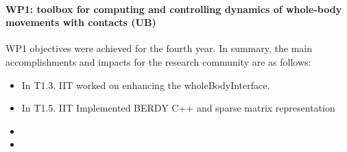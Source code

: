 

\paragraph*{WP1: toolbox for computing and controlling dynamics of whole-body movements with contacts (UB)}

WP1 objectives were achieved for the fourth year.  In summary, the main
accomplishments and impacts for the research community are as follows:

\begin{itemize}
  
\item In T1.3. IIT worked on enhancing the wholeBodyInterface.
\item In T1.5. IIT Implemented BERDY C++ and sparse matrix representation
\item 
\item 

 \end{itemize}

